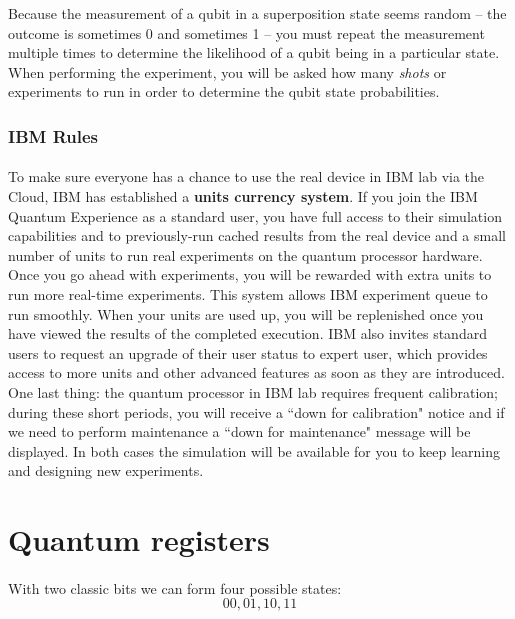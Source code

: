 \documentclass[a4paper,10pt]{article}
\begin{document}
Because the measurement of a qubit in a superposition state seems random – the outcome is sometimes 0 and sometimes 1 – you must repeat the measurement multiple times to determine the likelihood of a qubit being in a particular state. When performing the experiment, you will be asked how many \textit{shots} or experiments to run in order to determine the qubit state probabilities.

\subsubsection{IBM Rules}

\paragraph{} To make sure everyone has a chance to use the real device in IBM lab via the Cloud, IBM has established a \textbf{units currency system}. If you join the IBM Quantum Experience as a standard user, you have full access to their simulation capabilities and to previously-run cached results from the real device and a small number of units to run real experiments on the quantum processor hardware. Once you go ahead with experiments, you will be rewarded with extra units to run more real-time experiments. This system allows IBM experiment queue to run smoothly. When your units are used up, you will be replenished once you have viewed the results of the completed execution. IBM also invites standard users to request an upgrade of their user status to expert user, which provides access to more units and other advanced features as soon as they are introduced.
One last thing: the quantum processor in IBM lab requires frequent calibration; during these short periods, you will receive a ``down for calibration" notice and if we need to perform maintenance a ``down for maintenance" message will be displayed. In both cases the simulation will be available for you to keep learning and designing new experiments.

\newpage

\section{Quantum registers}

\paragraph{} With two classic bits we can form four possible states:
$$00, 01, 10, 11$$
\end{document}
